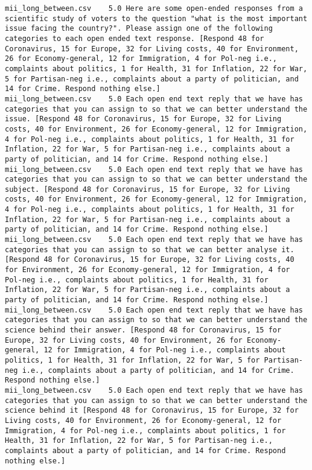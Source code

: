 \begin{lstlisting}[label=lst:promptvariants]
mii_long_between.csv	5.0	Here are some open-ended responses from a scientific study of voters to the question "what is the most important issue facing the country?". Please assign one of the following categories to each open ended text response. [Respond 48 for Coronavirus, 15 for Europe, 32 for Living costs, 40 for Environment, 26 for Economy-general, 12 for Immigration, 4 for Pol-neg i.e., complaints about politics, 1 for Health, 31 for Inflation, 22 for War, 5 for Partisan-neg i.e., complaints about a party of politician, and 14 for Crime. Respond nothing else.]
mii_long_between.csv	5.0	Each open end text reply that we have has categories that you can assign to so that we can better understand the issue. [Respond 48 for Coronavirus, 15 for Europe, 32 for Living costs, 40 for Environment, 26 for Economy-general, 12 for Immigration, 4 for Pol-neg i.e., complaints about politics, 1 for Health, 31 for Inflation, 22 for War, 5 for Partisan-neg i.e., complaints about a party of politician, and 14 for Crime. Respond nothing else.]
mii_long_between.csv	5.0	Each open end text reply that we have has categories that you can assign to so that we can better understand the subject. [Respond 48 for Coronavirus, 15 for Europe, 32 for Living costs, 40 for Environment, 26 for Economy-general, 12 for Immigration, 4 for Pol-neg i.e., complaints about politics, 1 for Health, 31 for Inflation, 22 for War, 5 for Partisan-neg i.e., complaints about a party of politician, and 14 for Crime. Respond nothing else.]
mii_long_between.csv	5.0	Each open end text reply that we have has categories that you can assign to so that we can better analyse it. [Respond 48 for Coronavirus, 15 for Europe, 32 for Living costs, 40 for Environment, 26 for Economy-general, 12 for Immigration, 4 for Pol-neg i.e., complaints about politics, 1 for Health, 31 for Inflation, 22 for War, 5 for Partisan-neg i.e., complaints about a party of politician, and 14 for Crime. Respond nothing else.]
mii_long_between.csv	5.0	Each open end text reply that we have has categories that you can assign to so that we can better understand the science behind their answer. [Respond 48 for Coronavirus, 15 for Europe, 32 for Living costs, 40 for Environment, 26 for Economy-general, 12 for Immigration, 4 for Pol-neg i.e., complaints about politics, 1 for Health, 31 for Inflation, 22 for War, 5 for Partisan-neg i.e., complaints about a party of politician, and 14 for Crime. Respond nothing else.]
mii_long_between.csv	5.0	Each open end text reply that we have has categories that you can assign to so that we can better understand the science behind it [Respond 48 for Coronavirus, 15 for Europe, 32 for Living costs, 40 for Environment, 26 for Economy-general, 12 for Immigration, 4 for Pol-neg i.e., complaints about politics, 1 for Health, 31 for Inflation, 22 for War, 5 for Partisan-neg i.e., complaints about a party of politician, and 14 for Crime. Respond nothing else.]

\end{lstlisting}
